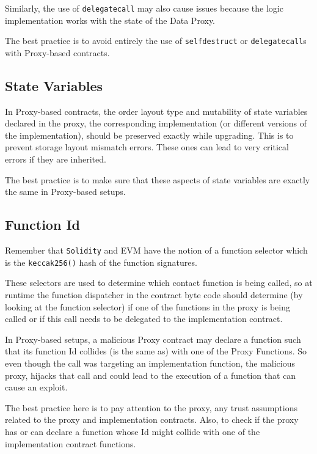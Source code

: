 Similarly, the use of \texttt{delegatecall} may also cause issues
because the logic implementation works with the state of the Data Proxy.

The best practice is to avoid entirely the use of \texttt{selfdestruct}
or \texttt{delegatecall}s with Proxy-based contracts.

\subsection{State Variables}\label{state-variables-1}

In Proxy-based contracts, the order layout type and mutability of state
variables declared in the proxy, the corresponding implementation (or
different versions of the implementation), should be preserved exactly
while upgrading. This is to prevent storage layout mismatch errors.
These ones can lead to very critical errors if they are inherited.

The best practice is to make sure that these aspects of state variables
are exactly the same in Proxy-based setups.

\subsection{Function Id}\label{function-id}

Remember that \texttt{Solidity} and EVM have the notion of a function
selector which is the \texttt{keccak256()} hash of the function
signatures.

These selectors are used to determine which contact function is being
called, so at runtime the function dispatcher in the contract byte code
should determine (by looking at the function selector) if one of the
functions in the proxy is being called or if this call needs to be
delegated to the implementation contract.

In Proxy-based setups, a malicious Proxy contract may declare a function
such that its function Id collides (is the same as) with one of the
Proxy Functions. So even though the call was targeting an implementation
function, the malicious proxy, hijacks that call and could lead to the
execution of a function that can cause an exploit.

The best practice here is to pay attention to the proxy, any trust
assumptions related to the proxy and implementation contracts. Also, to
check if the proxy has or can declare a function whose Id might collide
with one of the implementation contract functions.

